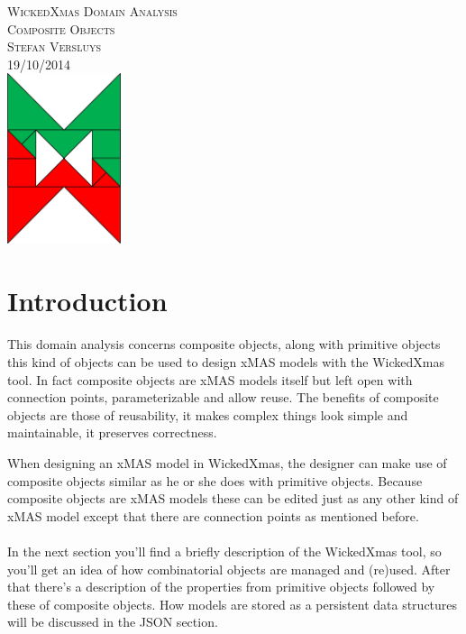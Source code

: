 \documentclass[a4paper,11pt,final]{article}
\begin{document}
\begin{titlepage}
	\vspace*{\fill}
	\begin{center}
		\textsc{\large WickedXmas Domain Analysis}\\[0.5cm]
		\textsc{\huge Composite Objects}\\[0.5cm]
		\textsc{Stefan Versluys}\\ \textsc{\scriptsize 19/10/2014}\\[2.0cm]
		\includegraphics[width=0.25\textwidth]{wXm}
	\end{center}
	\vspace*{\fill}
\end{titlepage}


\tableofcontents

\newpage

\section{Introduction}
\paragraph{}
This domain analysis concerns composite objects,
along with primitive objects this kind of objects can be used to design xMAS
models with the WickedXmas tool. In fact composite objects are xMAS models
itself but left open with connection points, parameterizable and allow reuse.
The benefits of composite objects are those of reusability, it makes complex
things look simple and maintainable, it preserves correctness.

When designing an xMAS model in WickedXmas, the designer can make use of
composite objects similar as he or she does with primitive objects. Because
composite objects are xMAS models these can be edited just as any other kind
of xMAS model except that there are connection points as mentioned before.

\paragraph{}
In the next section you'll find a briefly description of the WickedXmas tool,
so you'll get an idea of how combinatorial objects are managed and (re)used.
After that there's a description of the properties from primitive objects
followed by these of composite objects.
How models are stored as a  persistent data structures will be discussed in
the JSON section.
\end{document}
